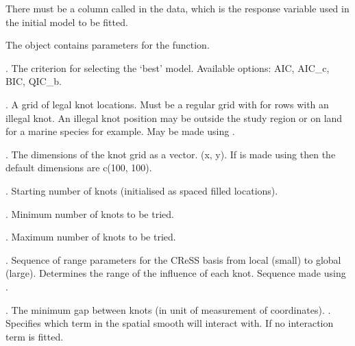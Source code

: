 \documentclass[a4paper]{book}
\begin{document}
\begin{Details}\relax
There must be a column called  in the data, which is the response variable used in the initial model to be fitted.

The object  contains parameters for the  function.

. The criterion for selecting the `best' model.  Available options: AIC, AIC\_c, BIC, QIC\_b.

. A grid of legal knot locations.  Must be a regular grid with  for rows with an illegal knot.  An illegal knot position may be outside the study region or on land for a marine species for example. May be made using .

. The dimensions of the knot grid as a vector. (x, y).  If  is made using  then the default dimensions are c(100, 100).

. Starting number of knots (initialised as spaced filled locations).

. Minimum number of knots to be tried.

. Maximum number of knots to be tried.

. Sequence of range parameters for the CReSS basis from local (small) to global (large).  Determines the range of the influence of each knot. Sequence made using .

. The minimum gap between knots (in unit of measurement of coordinates).
. Specifies which term in  the spatial smooth will interact with.  If  no interaction term is fitted.
\end{Details}
%
\end{document}
